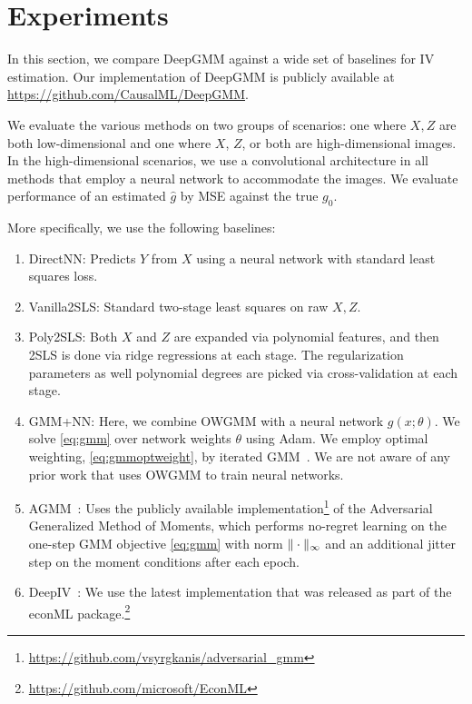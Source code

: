 \documentclass{article}
\theoremstyle{plain}
\theoremstyle{definition}
\begin{document}
%
%




%
%

\section{Experiments}\label{sec:experiments}
In this section, we compare DeepGMM against a wide set of baselines for IV estimation.
Our implementation of DeepGMM is publicly available at \url{https://github.com/CausalML/DeepGMM}.

We evaluate the various methods on two groups of scenarios: one where $X,Z$ are both low-dimensional and one where $X$, $Z$, or both are high-dimensional images. 
In the high-dimensional scenarios, we use a convolutional architecture in all methods that employ a neural network to accommodate the images.
We evaluate performance of an estimated $\hat{g}$ by MSE against the true $g_0$.

More specifically, we use the following baselines:  
\begin{enumerate}[align=left,leftmargin=*,labelindent=0in,topsep=0ex,itemsep=0.25ex,partopsep=0ex,parsep=0ex]
    \item DirectNN: Predicts $Y$ from $X$ using a neural network with standard least squares loss. 
    \item Vanilla2SLS: Standard two-stage least squares on raw $X,Z$.
    \item Poly2SLS: Both $X$ and $Z$ are expanded via polynomial features, and then 2SLS is done via ridge regressions at each stage. The regularization parameters as well polynomial degrees are picked via cross-validation at each stage.
    \item GMM+NN: Here, we combine OWGMM with a neural network $g(x;\theta)$. We solve \cref{eq:gmm} over network weights $\theta$ using Adam. We employ optimal weighting, \cref{eq:gmmoptweight}, by iterated GMM~\cite{hansen1996finite}. We are not aware of any prior work that uses OWGMM to train neural networks.
    \item AGMM~\cite{lewis2018adversarial}: Uses the publicly available implementation\footnote{\url{https://github.com/vsyrgkanis/adversarial_gmm}} of the Adversarial Generalized Method of Moments, which performs no-regret learning on the one-step GMM objective \cref{eq:gmm} with norm $\|\cdot\|_\infty$ and an additional jitter step on the moment conditions after each epoch. 
    \item DeepIV~\cite{hartford2017deep}: We use the latest implementation that was released as part of the econML package.\footnote{\url{https://github.com/microsoft/EconML}}
\end{enumerate}
\end{document}
